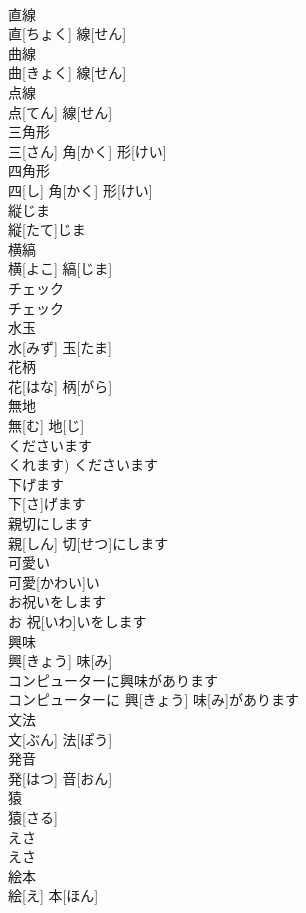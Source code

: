 \documentclass[8pt]{extreport}
\begin{document}
\begin{CJK}{UTF8}{min}
\\	直線	
\\	直[ちょく] 線[せん]		
\\	曲線	
\\	曲[きょく] 線[せん]		
\\	点線	
\\	点[てん] 線[せん]		
\\	三角形	
\\	三[さん] 角[かく] 形[けい]		
\\	四角形	
\\	四[し] 角[かく] 形[けい]		
\\	縦じま	
\\	縦[たて]じま		
\\	横縞	
\\	横[よこ] 縞[じま]		
\\	チェック	
\\	チェック		
\\	水玉	
\\	水[みず] 玉[たま]		
\\	花柄	
\\	花[はな] 柄[がら]		
\\	無地	
\\	無[む] 地[じ]		
\\	くださいます	
\\	くれます)	くださいます		
\\	下げます	
\\	下[さ]げます		
\\	親切にします	
\\	親[しん] 切[せつ]にします		
\\	可愛い	
\\	可愛[かわい]い		
\\	お祝いをします	
\\	お 祝[いわ]いをします		
\\	興味	
\\	興[きょう] 味[み]		
\\	コンピューターに興味があります	
\\	コンピューターに 興[きょう] 味[み]があります		
\\	文法	
\\	文[ぶん] 法[ぽう]		
\\	発音	
\\	発[はつ] 音[おん]		
\\	猿	
\\	猿[さる]		
\\	えさ	
\\	えさ		
\\	絵本	
\\	絵[え] 本[ほん]		

\end{CJK}
\end{document}
